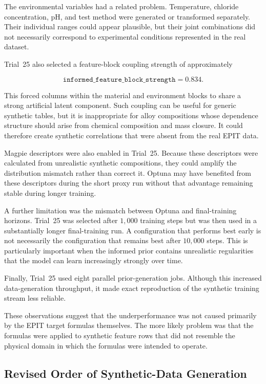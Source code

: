\documentclass{article}
\begin{document}
The environmental variables had a related problem. Temperature, chloride
concentration, pH, and test method were generated or transformed separately.
Their individual ranges could appear plausible, but their joint combinations
did not necessarily correspond to experimental conditions represented in the
real dataset.

Trial~25 also selected a feature-block coupling strength of approximately

\[
\texttt{informed\_feature\_block\_strength}
=
0.834.
\]

This forced columns within the material and environment blocks to share a
strong artificial latent component. Such coupling can be useful for generic
synthetic tables, but it is inappropriate for alloy compositions whose
dependence structure should arise from chemical composition and mass closure.
It could therefore create synthetic correlations that were absent from the
real EPIT data.

Magpie descriptors were also enabled in Trial~25. Because these descriptors
were calculated from unrealistic synthetic compositions, they could amplify
the distribution mismatch rather than correct it. Optuna may have benefited
from these descriptors during the short proxy run without that advantage
remaining stable during longer training.

A further limitation was the mismatch between Optuna and final-training
horizons. Trial~25 was selected after \(1{,}000\) training steps but was then
used in a substantially longer final-training run. A configuration that
performs best early is not necessarily the configuration that remains best
after \(10{,}000\) steps. This is particularly important when the informed
prior contains unrealistic regularities that the model can learn increasingly
strongly over time.

Finally, Trial~25 used eight parallel prior-generation jobs. Although this
increased data-generation throughput, it made exact reproduction of the
synthetic training stream less reliable.

These observations suggest that the underperformance was not caused primarily
by the EPIT target formulas themselves. The more likely problem was that the
formulas were applied to synthetic feature rows that did not resemble the
physical domain in which the formulas were intended to operate.

\subsection{Revised Order of Synthetic-Data Generation}
\end{document}
